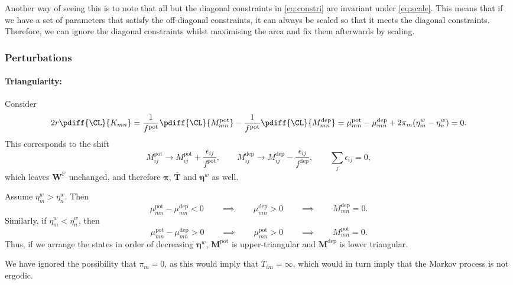 \documentclass[12pt]{article}
\newcommand{\eqm}{\pi}
\newcommand{\eq}{\boldsymbol{\eqm}}
\newcommand{\fptm}{T}
\newcommand{\fpt}{\mathbf{\fptm}}
\newcommand{\fptbm}{\overline{\fptm}}
\newcommand{\fptb}{\overline{\fpt}}
\newcommand{\etwm}{\eta^w}
\newcommand{\etw}{\boldsymbol{\eta}^w}
\newcommand{\Wm}{W}
\newcommand{\W}{\mathbf{\Wm}}
\newcommand{\MMdm}{M}
\newcommand{\MMd}{\mathbf{\MMdm}}
\newcommand{\encm}{K}
\newcommand{\frg}{\W^{\mathrm{F}}}
\newcommand{\kktm}{\mu}
\newcommand{\pot}{^{\text{pot}}}
\newcommand{\dep}{^{\text{dep}}}
\begin{document}
Another way of seeing this is to note that all but the diagonal constraints in \cref{eq:constri} are invariant under \cref{eq:scale}.
This means that if we have a set of parameters that satisfy the off-diagonal constraints, it can always be scaled so that it meets the diagonal constraints.
Therefore, we can ignore the diagonal constraints whilst maximising the area and fix them afterwards by  scaling.


\subsubsection{Perturbations}\label{sec:areapert}

\paragraph{Triangularity:}\label{sec:triangular}

Consider
%
\begin{equation}\label{eq:shiftqderiv}
  2r\pdiff{\CL}{\encm_{mn}} =
  \frac{1}{f\pot} \pdiff{\CL}{\MMdm\pot_{mn}} - \frac{1}{f\pot} \pdiff{\CL}{\MMdm\dep_{mn}}
   = \kktm\pot_{mn} - \kktm\dep_{mn} + 2\eqm_m (\etwm_m - \etwm_n)
   = 0.
\end{equation}
%
This corresponds to the shift
%
\begin{equation}\label{eq:shiftq}
  \MMdm\pot_{ij} \to \MMdm\pot_{ij} + \frac{\epsilon_{ij}}{f\pot},
  \qquad
  \MMdm\dep_{ij} \to \MMdm\dep_{ij} - \frac{\epsilon_{ij}}{f\dep},
  \qquad
  \sum_j \epsilon_{ij} = 0,
\end{equation}
%
which leaves $\frg$ unchanged, and therefore $\eq$, $\fptb$ and $\etw$ as well.

Assume $\etwm_m > \etwm_n$. Then
%
\begin{equation}\label{eq:lowertriangular}
 \kktm\pot_{mn} - \kktm\dep_{mn} < 0
 \qquad\implies\qquad
 \kktm\dep_{mn} > 0
 \qquad\implies\qquad
 \MMdm\dep_{mn} = 0.
\end{equation}
%
Similarly, if $\etwm_m < \etwm_n$, then
%
\begin{equation}\label{eq:uppertriangular}
 \kktm\pot_{mn} - \kktm\dep_{mn} > 0
 \qquad\implies\qquad
 \kktm\pot_{mn} >0
 \qquad\implies\qquad
 \MMdm\pot_{mn}=0.
\end{equation}
%
Thus, if we arrange the states in order of decreasing $\etw$, $\MMd\pot$ is upper-triangular and $\MMd\dep$ is lower triangular.

We have ignored the possibility that $\eqm_m = 0$, as this would imply that $\fptbm_{im} = \infty$, which would in turn imply that the Markov process is not ergodic.
\end{document}
